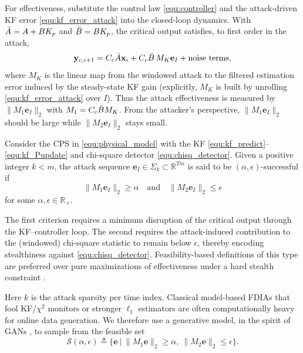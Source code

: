 For effectiveness, substitute the control law \eqref{equ:controller} and the attack-driven KF error \eqref{equ:kf_error_attack} into the closed-loop dynamics. With $\Bar{A}=A+BK_p$ and $\Bar{B}=BK_p$, the critical output satisfies, to first order in the attack,
\begin{equation}\label{equ:M1}
\mathbf{y}_{c,{i+1}}
=C_c\Bar{A}\mathbf{x}_i+C_c\Bar{B}\,M_K\mathbf{e}_I+\text{noise terms},
\end{equation}
where $M_K$ is the linear map from the windowed attack to the filtered estimation error induced by the steady-state KF gain (explicitly, $M_K$ is built by unrolling \eqref{equ:kf_error_attack} over $I$). Thus the attack effectiveness is measured by $\|M_1\mathbf{e}_I\|_2$ with $M_1=C_c\Bar{B}M_K$. From the attacker's perspective, $\|M_1\mathbf{e}_I\|_2$ should be large while $\|M_2\mathbf{e}_I\|_2$ stays small.

\begin{definition}\label{Def:Successful_FDIA}
Consider the CPS in \eqref{equ:physical_model} with the KF \eqref{equ:kf_predict}--\eqref{equ:kf_Pupdate} and chi-square detector \eqref{equ:chisq_detector}. Given a positive integer $k<m$, the attack sequence $\mathbf{e}_I\in\Sigma_k\subset\mathbb{R}^{Tm}$ is said to be $(\alpha,\epsilon)$-successful if
\begin{equation}\label{equ:def_success_FDIA}
\|M_1\mathbf{e}_I\|_2\geq\alpha
\quad\text{and}\quad
\|M_2\mathbf{e}_I\|_2\leq\epsilon
\end{equation}
for some $\alpha,\epsilon\in\mathbb{R}_{+}$.
\end{definition}
\begin{remark}
The first criterion requires a minimum disruption of the critical output through the KF--controller loop. The second requires the attack-induced contribution to the (windowed) chi-square statistic to remain below $\epsilon$, thereby encoding stealthiness against \eqref{equ:chisq_detector}. Feasibility-based definitions of this type are preferred over pure maximizations of effectiveness under a hard stealth constraint \cite{sui2020vulnerability,mo2010false}.
\end{remark}
\noindent Here $k$ is the attack sparsity per time index. Classical model-based FDIAs that fool KF/$\chi^2$ monitors \cite{mo2010false} or stronger $\ell_1$ estimators \cite{zheng2021Resilient} are often computationally heavy for online data generation. We therefore use a generative model, in the spirit of GANs \cite{goodfellow2014generative}, to sample from the feasible set
\begin{equation}\label{equ:success_FDIA_set}
\mathcal{S}(\alpha,\epsilon)
\triangleq
\big\{\mathbf{e}\ \big|\ \|M_1\mathbf{e}\|_2\geq\alpha,\ \|M_2\mathbf{e}\|_2\leq\epsilon\big\}.
\end{equation}


